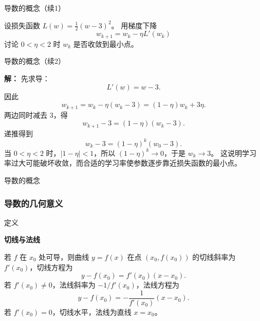 \documentclass[aspectratio=169,10pt,fontset=fandol]{ctexbeamer}
\renewenvironment{solution}{\par\noindent\textbf{解：}\quad}{\par}
\begin{document}
\begin{frame}[t,fragile]{导数的概念（续1）}
\footnotesize
{\footnotesize
\begin{application}[导数与梯度下降的基本思想]
	\begin{example}
		设损失函数 $L(w)=\frac12(w-3)^2$。 用梯度下降
		\[
		w_{k+1}=w_k-\eta L'(w_k)
		\]
		讨论 $0<\eta<2$ 时 $w_k$ 是否收敛到最小点。
	\end{example}
\end{application}
}
\end{frame}
\begin{frame}[t,fragile]{导数的概念（续2）}
\footnotesize
{\footnotesize
\begin{application}[导数与梯度下降的基本思想]

	\begin{solution}
		先求导：
		\[
		L'(w)=w-3.
		\]
		因此
		\[
		w_{k+1}=w_k-\eta(w_k-3)=(1-\eta)w_k+3\eta.
		\]
		两边同时减去 $3$，得
		\[
		w_{k+1}-3=(1-\eta)(w_k-3).
		\]
		递推得到
		\[
		w_k-3=(1-\eta)^k(w_0-3).
		\]
		当 $0<\eta<2$ 时，$|1-\eta|<1$，所以 $(1-\eta)^k\to0$，于是 $w_k\to3$。 这说明学习率过大可能破坏收敛，而合适的学习率使参数逐步靠近损失函数的最小点。
	\end{solution}
	
\end{application}
}
\end{frame}
\begin{frame}[t,fragile]{导数的概念}
\normalsize
{\normalsize

\subsubsection*{导数的几何意义}


}
\begin{block}{定义}
{\normalsize
\textbf{切线与法线}\par

若 $f$ 在 $x_0$ 处可导，则曲线 $y=f(x)$ 在点 $(x_0,f(x_0))$ 的切线斜率为 $f'(x_0)$，切线方程为
\[
y-f(x_0)=f'(x_0)(x-x_0).
\]
若 $f'(x_0)\neq0$，法线斜率为 $-1/f'(x_0)$，法线方程为
\[
y-f(x_0)=-\frac{1}{f'(x_0)}(x-x_0).
\]
若 $f'(x_0)=0$，切线水平，法线为直线 $x=x_0$。

}
\end{block}
\end{frame}
\end{document}
